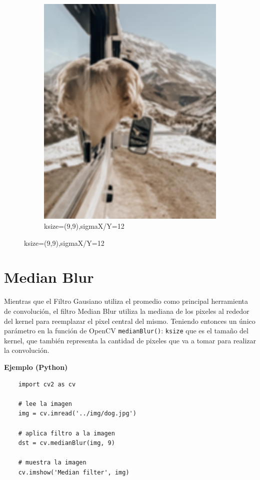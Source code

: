 \documentclass[a4paper, 12pt]{article}
\begin{document}
\begin{figure}[!ht]
\begin{subfigure}{0.4\textwidth}
        \includegraphics[width=\textwidth]{img/dog-gaussian.png}
        \caption{ksize=(9,9),sigmaX/Y=12}
    \end{subfigure}
\end{figure}

\section{Median Blur}
Mientras que el Filtro Gausiano utiliza el promedio como principal herramienta de convolución, el filtro Median Blur utiliza la mediana de los pixeles al rededor del kernel para reemplazar el pixel central del mismo. Teniendo entonces un único parámetro en la función de OpenCV \lstinline{medianBlur()}: \lstinline{ksize} que es el tamaño del kernel, que también representa la cantidad de pixeles que va a tomar para realizar la convolución.

\textbf{Ejemplo (Python)}

\begin{lstlisting}
    import cv2 as cv

    # lee la imagen
    img = cv.imread('../img/dog.jpg')

    # aplica filtro a la imagen
    dst = cv.medianBlur(img, 9)

    # muestra la imagen
    cv.imshow('Median filter', img)
\end{lstlisting}
\end{document}
